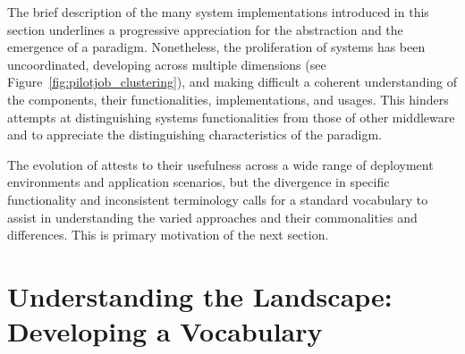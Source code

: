 \documentclass{sig-alternate}
\begin{document}


The brief description of the many \pilotjob system implementations introduced in
this section underlines a progressive appreciation for the \pilot abstraction
and the emergence of a \pilot paradigm. Nonetheless, the proliferation of
\pilotjob systems has been uncoordinated, developing across multiple dimensions
(see Figure~\ref{fig:pilotjob_clustering}), and making difficult a coherent
understanding of the \pilot components, their functionalities, implementations,
and usages. This hinders attempts at distinguishing \pilotjob systems
functionalities from those of other middleware and to appreciate the
distinguishing characteristics of the \pilot paradigm.




The evolution of \pilots attests to their usefulness across a wide range of
deployment environments and application scenarios, but the divergence in
specific functionality and inconsistent terminology calls for a standard
vocabulary to assist in understanding the varied approaches and their
commonalities and differences. This is primary motivation of the next section.



\newcommand{\vocab}[1]{\textbf{#1}\xspace}
\newcommand{\prop}[1]{\textit{#1}\xspace}
\newcommand{\impterm}[1]{\texttt{#1}\xspace}

\section{Understanding the Landscape: Developing a Vocabulary}
\label{sec:understanding}
\end{document}
